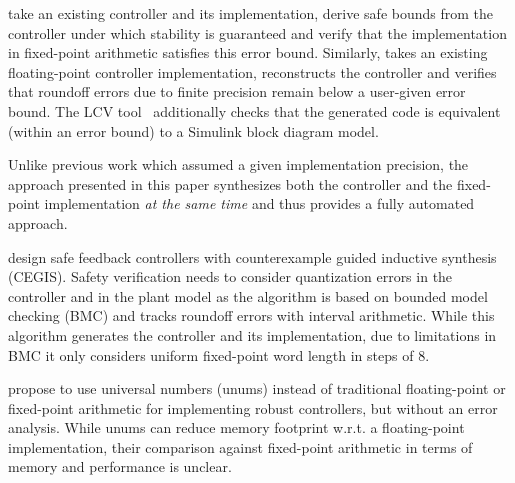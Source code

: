 \citet{Anta10} take an existing controller and its implementation, derive safe
bounds from the controller under which stability is guaranteed and verify that
the implementation in fixed-point arithmetic satisfies this error bound.
Similarly, \citet{ParkPSL17} takes an existing floating-point controller
implementation, reconstructs the controller and verifies that roundoff errors
due to finite precision remain below a user-given error bound. The LCV tool~\cite{Park2019}
additionally checks that the generated code is equivalent (within an error bound)
to a Simulink block diagram model.

Unlike previous work which assumed a given implementation precision, the
approach presented in this paper synthesizes both the controller and the
fixed-point implementation \emph{at the same time} and thus provides
a fully automated approach.

\citet{Abate2017} design safe feedback controllers with counterexample guided
inductive synthesis (CEGIS). Safety verification needs to consider quantization
errors in the controller and in the plant model as the algorithm is based on
bounded model checking (BMC) and tracks roundoff errors with interval
arithmetic. While this algorithm generates the controller and its
implementation, due to limitations in BMC it only considers uniform fixed-point
word length in steps of 8.

\citet{memoryMPC} propose to use universal numbers (unums) instead of
traditional floating-point or fixed-point arithmetic for implementing robust
controllers, but without an error analysis. While unums can reduce memory
footprint w.r.t. a floating-point implementation, their comparison against
fixed-point arithmetic in terms of memory and performance is unclear.

